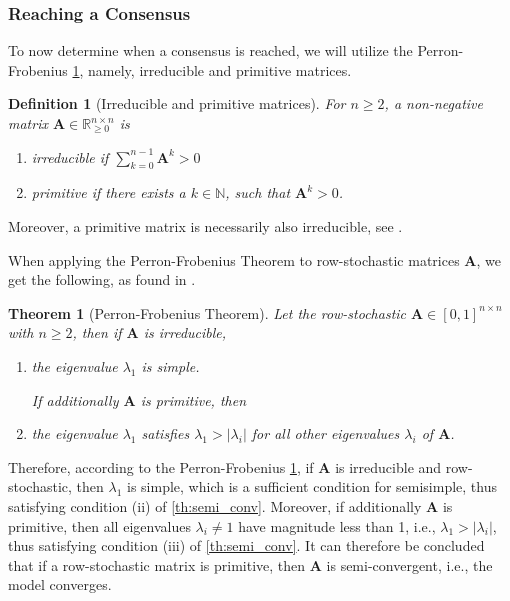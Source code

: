 \documentclass[journal,compsoc,10pt]{IEEEtran}
\newcommand{\RR}{\mathbb{R}}
\newcommand{\NN}{\mathbb{N}}
\renewcommand{\vec}[1]{\bm{#1}}        %
\newcommand{\mat}[1]{\bm{#1}}          %
\newtheorem{theorem}{Theorem}[section]
\newtheorem{definition}{Definition}[section]
\begin{document}
\subsubsection{Reaching a Consensus} \label{sec:reaching_consensus}
To now determine when a consensus is reached,  we will utilize the Perron-Frobenius \cref{th:perron-frobenius}, namely, irreducible and primitive matrices.
\begin{definition} [Irreducible and primitive matrices] \label{def:irr_prim_mat}
    For $n \geq 2$, a non-negative matrix $\mat A \in \RR_{\geq0}^{n\times n}$ is 
    \begin{enumerate}[label=(\roman*)]
        \item \textit{irreducible} if $\sum_{k=0}^{n-1}\mat A^k > 0$
        \item \textit{primitive} if there exists a $k \in \NN$, such that $\mat A^k >0$.
    \end{enumerate}
\end{definition}
Moreover, a primitive matrix is necessarily also irreducible, see \cite{Bullo_lecture}.

When applying the Perron-Frobenius Theorem to row-stochastic matrices $\mat A$, we get the following, as found in \cite{Bullo_lecture}.
\begin{theorem}[Perron-Frobenius Theorem]\label{th:perron-frobenius}
    Let the row-stochastic $\mat A \in [0,1]^{n\times n}$ with $n\geq 2$, then if $\mat A$ is irreducible,
    \begin{enumerate}[label=(\roman*)]
        \item the eigenvalue $\lambda_1$ is simple.
    
    \textnormal{If additionally $\mat A$ is primitive, then}
        \item the eigenvalue $\lambda_1$ satisfies $\lambda_1 > |\lambda_i|$ for all other eigenvalues $\lambda_i$ of $\mat A$. 
    \end{enumerate}
\end{theorem}
Therefore, according to the Perron-Frobenius \cref{th:perron-frobenius}, if $\mat A$ is irreducible and row-stochastic, then $\lambda_1$ is simple, which is a sufficient condition for semisimple, thus satisfying condition (ii) of \cref{th:semi_conv}. Moreover, if additionally $\mat A$ is primitive, then all eigenvalues $\lambda_i \neq 1$ have magnitude less than 1, i.e., $\lambda_1 > |\lambda_i|$, thus satisfying condition (iii) of \cref{th:semi_conv}.
It can therefore be concluded that if a row-stochastic matrix is primitive, then $\mat A$ is semi-convergent, i.e., the model converges.
\end{document}
